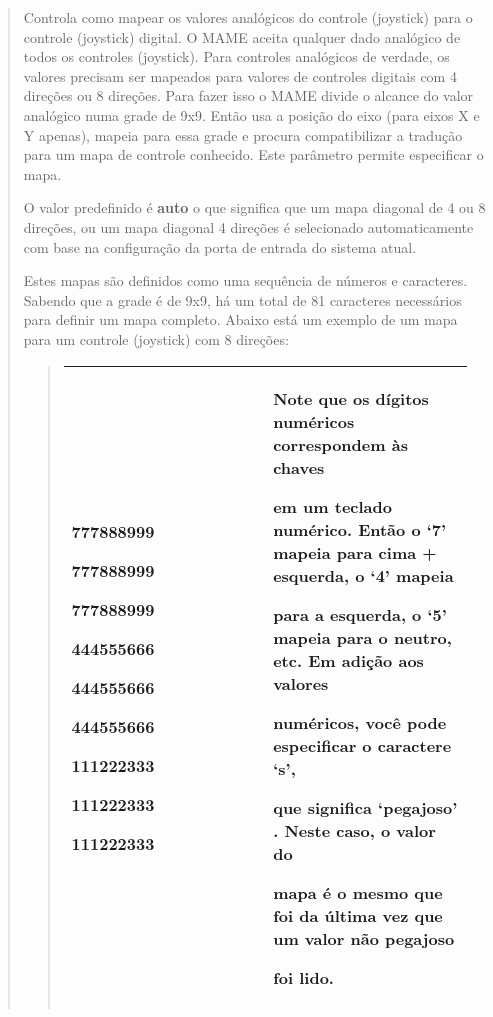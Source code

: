 \documentclass[letterpaper,10pt,brazil]{sphinxmanual}
\begin{document}
\begin{quote}

Controla como mapear os valores analógicos do controle (joystick)
para o controle (joystick) digital. O MAME aceita qualquer dado
analógico de todos os controles (joystick). Para controles
analógicos de verdade, os valores precisam ser mapeados para valores
de controles digitais com 4 direções ou 8 direções. Para fazer isso
o MAME divide o alcance do valor analógico numa grade de 9x9.
Então usa a posição do eixo (para eixos X e Y apenas), mapeia para
essa grade e procura compatibilizar a tradução para um mapa de
controle conhecido. Este parâmetro permite especificar o mapa.

O valor predefinido é \textbf{auto} o que significa que um mapa diagonal
de 4 ou 8 direções, ou um mapa diagonal 4 direções é selecionado
automaticamente com base na configuração da porta de entrada do
sistema atual.

Estes mapas são definidos como uma sequência de números e
caracteres. Sabendo que a grade é de 9x9, há um total de 81
caracteres necessários para definir um mapa completo.
Abaixo está um exemplo de um mapa para um controle (joystick) com
8 direções:
\begin{quote}

\noindent\begin{tabular}{|p{0.475\linewidth}|p{0.475\linewidth}|}
\hline

\begin{DUlineblock}{0em}
\item[] 777888999
\item[] 777888999
\item[] 777888999
\item[] 444555666
\item[] 444555666
\item[] 444555666
\item[] 111222333
\item[] 111222333
\item[] 111222333
\end{DUlineblock}
&
\begin{DUlineblock}{0em}
\item[] Note que os dígitos numéricos correspondem às chaves
\item[] em um teclado numérico. Então o `7' mapeia para cima + esquerda, o `4' mapeia
\item[] para a esquerda, o `5' mapeia para o neutro, etc. Em adição aos valores
\item[] numéricos, você pode especificar o caractere `s',
\item[] que significa `pegajoso' . Neste caso, o valor do
\item[] mapa é o mesmo que foi da última vez que um valor não pegajoso
\item[] foi lido.
\end{DUlineblock}
\\
\hline\end{tabular}


\end{quote}
\end{quote}
\end{document}
